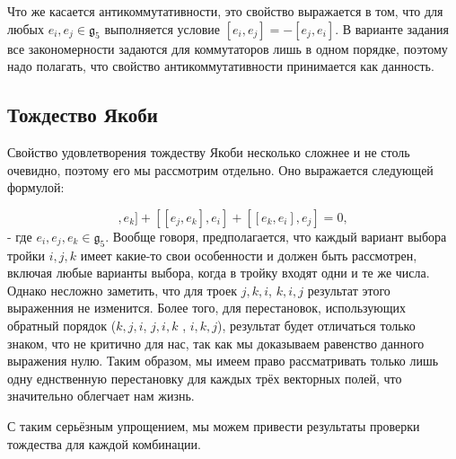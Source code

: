 \documentclass{article}
\begin{document}
Что же касается антикоммутативности, это свойство выражается в том, что для любых $e_{i}, e_{j} \in \mathfrak{g}_{5}$ выполняется условие $[e_{i}, e_{j}] = - [e_{j}, e_{i}]$. В варианте задания все закономерности задаются для коммутаторов лишь в одном порядке, поэтому надо полагать, что свойство антикоммутативности принимается как данность.

\subsection{Тождество Якоби}
Свойство удовлетворения тождеству Якоби несколько сложнее и не столь очевидно, поэтому его мы рассмотрим отдельно. Оно выражается следующей формулой:

\begin{equation*}
[[e_{i}, e_{j}], e_{k}] + [[e_{j}, e_{k}], e_{i}] + [[e_{k}, e_{i}], e_{j}] = 0,
\end{equation*}
 - где $e_{i}, e_{j}, e_{k} \in \mathfrak{g}_{5}$. Вообще говоря, предполагается, что каждый вариант выбора тройки $i,j,k$ имеет какие-то свои особенности и должен быть рассмотрен, включая любые варианты выбора, когда в тройку входят одни и те же числа. Однако несложно заметить, что для троек $j,k,i$, $k,i,j$ результат этого выраженния не изменится. Более того, для перестановок, использующих обратный порядок ($k,j,i$,  $j,i,k$ , $i,k,j$), результат будет отличаться только знаком, что не критично для нас, так как мы доказываем равенство данного выражения нулю. Таким образом, мы имеем право рассматривать только лишь одну еднственную перестановку для каждых трёх векторных полей, что значительно облегчает нам жизнь.

С таким серьёзным упрощением, мы можем привести результаты проверки тождества для каждой комбинации.
\end{document}
